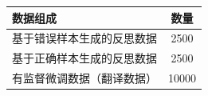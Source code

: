 
\begin{table}[htbp]
\centering
\footnotesize
{}
\begin{tabular}{lc}
\toprule
\textbf{数据组成} & \textbf{数量} \\
\midrule
基于错误样本生成的反思数据 & 2500 \\
基于正确样本生成的反思数据 & 2500 \\
有监督微调数据（翻译数据） & 10000 \\
\bottomrule
\end{tabular}
\label{tab:method2-cft-data-stats}
\end{table}
